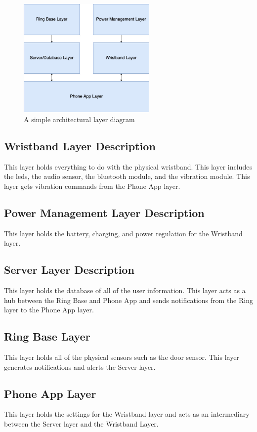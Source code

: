 \begin{figure}[h!]
	\centering
 	\includegraphics[width=0.60\textwidth]{images/ADS Diagrams-Basic ADS Diagram.jpg}
 \caption{A simple architectural layer diagram}
\end{figure}

\subsection{Wristband Layer Description}
This layer holds everything to do with the physical wristband. This layer includes the leds, the audio sensor, the bluetooth module, and the vibration module. This layer gets vibration commands from the Phone App layer.

\subsection{Power Management Layer Description}
This layer holds the battery, charging, and power regulation for the Wristband layer.

\subsection{Server Layer Description}
This layer holds the database of all of the user information. This layer acts as a hub between the Ring Base and Phone App and sends notifications from the Ring layer to the Phone App layer.

\subsection{Ring Base Layer}
This layer holds all of the physical sensors such as the door sensor. This layer generates notifications and alerts the Server layer.

\subsection{Phone App Layer}
This layer holds the settings for the Wristband layer and acts as an intermediary between the Server layer and the Wristband Layer.